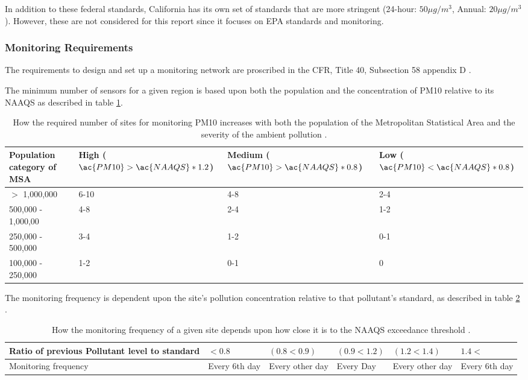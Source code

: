 \documentclass{article}
\begin{document}
In addition to these federal standards, California has its own set of standards that are more stringent (24-hour: $50 \mu g/m^3$, Annual: $20 \mu g/m^3$).  However, these are not considered for this report since it focuses on \ac{EPA} standards and monitoring.

\subsubsection*{Monitoring Requirements}\label{subsubsec:monreqs}
The requirements to design and set up a monitoring network are proscribed in the \ac{CFR}, Title 40, Subsection 58 appendix D \citep{CFR:Title40-58}.

The minimum number of sensors for a given region is based upon both the population and the concentration of \ac{PM10} relative to its \ac{NAAQS} as described in table \ref{tab:NAAQS_site_count}.
\begin{table}[ht]
    \centering
    \begin{tabular}{p{}|p{}|p{}|p{}}
         Population category of \ac{MSA} & High ($\ac{PM10} > \ac{NAAQS} *1.2$) & Medium ($\ac{PM10} > \ac{NAAQS} *0.8$) & Low ($\ac{PM10} < \ac{NAAQS}*0.8$) \\
         \hline
         $>$ 1,000,000 & 6-10 & 4-8 & 2-4 \\
         500,000 - 1,000,00 & 4-8 & 2-4 & 1-2 \\
         250,000 - 500,000 & 3-4 & 1-2 & 0-1 \\
         100,000 - 250,000 & 1-2 & 0-1 & 0 \\
    \end{tabular}
    \caption{How the required number of sites for monitoring \ac{PM10} increases with both the population of the Metropolitan Statistical Area and the severity of the ambient pollution \citep{CFR:Title40-58}. }
    \label{tab:NAAQS_site_count}
\end{table}

The monitoring frequency is dependent upon the site's pollution concentration relative to that pollutant's standard, as described in table \ref{tab:EPA_monitoring_freq}  \citep{AQMNP:2019}.

\begin{table}[ht]
    \centering
    \begin{tabular}{p{}|p{}|p{}|p{}|p{}|p{}}
         Ratio of previous Pollutant level to standard & $<0.8$ & $(0.8 < 0.9)$ & $(0.9 < 1.2)$ & $(1.2 < 1.4)$ & $1.4<$  \\
         \hline
         Monitoring frequency & Every 6th day & Every other day & Every Day & Every other day & Every 6th day \\ 
    \end{tabular}
    \caption{How the monitoring frequency of a given site depends upon how close it is to the \ac{NAAQS} exceedance threshold \citep{AQMNP:2019}.}
\label{tab:EPA_monitoring_freq}
\end{table}
\end{document}
